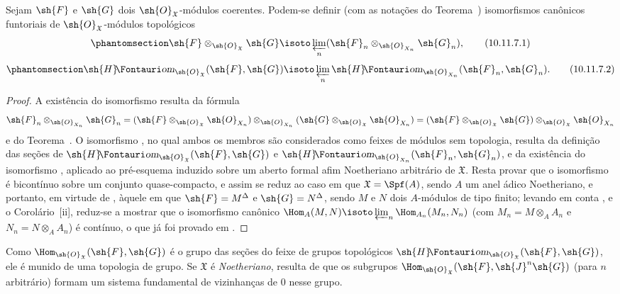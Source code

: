 \documentclass[oneside]{amsart}
\makeatletter
\newcommand*{\ega@sheafop}[3]{\sh{#1}#2\textup{\kern-2.2pt{\Fontauri\slshape #3}}}
\newcommand*{\shHom}{\ega@sheafop{H}{}{om}}
\let\EGAOriginalLabel\label
\renewcommand{\label}[1]{\phantomsection\EGAOriginalLabel{#1}}
\makeatother
\begin{document}
\begin{proposition}[10.11.7]
\label{I.10.11.7}
Sejam $\sh{F}$ e $\sh{G}$ dois $\sh{O}_\mathfrak{X}$-módulos coerentes.
Podem-se definir (com as notações do Teorema~) isomorfismos canônicos funtoriais de $\sh{O}_\mathfrak{X}$-módulos topológicos 
\[
\label{I.10.11.7.1}
  \sh{F}\otimes_{\sh{O}_\mathfrak{X}}\sh{G}\isoto\varprojlim_n(\sh{F}_n\otimes_{\sh{O}_{X_n}}\sh{G}_n),
  \tag{10.11.7.1}
\]
\[
\label{I.10.11.7.2}
  \shHom_{\sh{O}_\mathfrak{X}}(\sh{F},\sh{G})\isoto\varprojlim_n\shHom_{\sh{O}_{X_n}}(\sh{F}_n,\sh{G}_n).
  \tag{10.11.7.2}
\]
\end{proposition}

\begin{proof}
A existência do isomorfismo  resulta da fórmula
\[
  \sh{F}_n\otimes_{\sh{O}_{X_n}}\sh{G}_n=(\sh{F}\otimes_{\sh{O}_\mathfrak{X}}\sh{O}_{X_n})\otimes_{\sh{O}_{X_n}}(\sh{G}\otimes_{\sh{O}_\mathfrak{X}}\sh{O}_{X_n})=(\sh{F}\otimes_{\sh{O}_\mathfrak{X}}\sh{G})\otimes_{\sh{O}_\mathfrak{X}}\sh{O}_{X_n}
\]
e do Teorema~.
O isomorfismo , no qual ambos os membros são considerados como feixes de módulos sem topologia, resulta da definição das seções de $\shHom_{\sh{O}_\mathfrak{X}}(\sh{F},\sh{G})$ e $\shHom_{\sh{O}_{X_n}}(\sh{F}_n,\sh{G}_n)$, e da existência do isomorfismo , aplicado ao pré-esquema induzido sobre um aberto formal afim Noetheriano arbitrário de $\mathfrak{X}$.
Resta provar que o isomorfismo  é bicontínuo sobre um conjunto quase-compacto, e assim se reduz ao caso em que $\mathfrak{X}=\Spf(A)$, sendo $A$ um anel ádico Noetheriano, e portanto, em virtude de , àquele em que $\sh{F}=M^\Delta$ e $\sh{G}=N^\Delta$, sendo $M$ e $N$ dois $A$-módulos de tipo finito; levando em conta ,  e o Corolário~[ii], reduz-se a mostrar que o isomorfismo canônico $\Hom_A(M,N)\isoto\varprojlim_n\Hom_{A_n}(M_n,N_n)$ (com $M_n=M\otimes_A A_n$ e $N_n=N\otimes_A A_n$) é contínuo, o que já foi provado em .
\end{proof}

\begin{env}[10.11.8]
\label{I.10.11.8}
Como $\Hom_{\sh{O}_\mathfrak{X}}(\sh{F},\sh{G})$ é o grupo das seções do feixe de grupos topológicos $\shHom_{\sh{O}_\mathfrak{X}}(\sh{F},\sh{G})$, ele é munido de uma topologia de grupo.
Se $\mathfrak{X}$ é \emph{Noetheriano}, resulta de  que os subgrupos $\Hom_{\sh{O}_\mathfrak{X}}(\sh{F},\sh{J}^n\sh{G})$ (para $n$ arbitrário) formam um sistema fundamental de vizinhanças de $0$ nesse grupo.
\end{env}
\end{document}
